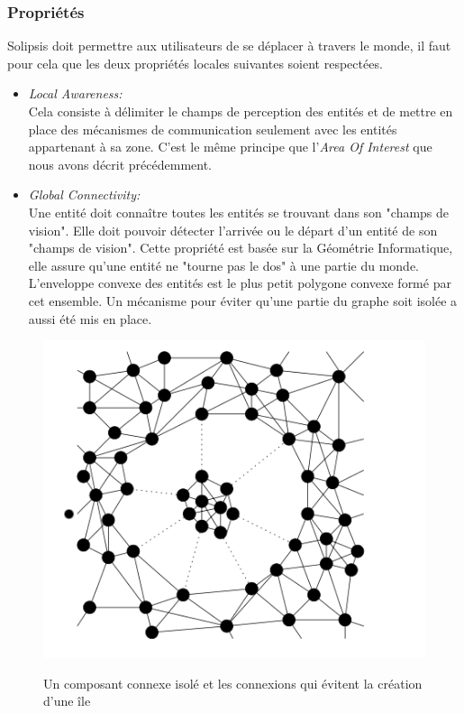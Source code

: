 		\subsubsection{Propriétés}
	Solipsis doit permettre aux utilisateurs de se déplacer à travers le monde, il faut pour cela que les deux propriétés locales suivantes soient respectées.
	\begin{itemize}
	\renewcommand{\labelitemi}{$\bullet$}
		\item \textit{Local Awareness:}\\
		Cela consiste à délimiter le champs de perception des entités et de mettre en place des mécanismes de communication seulement avec les entités appartenant à sa zone. C'est le même principe que l'\textit{Area Of Interest} que nous avons décrit précédemment. 
		\item \textit{Global Connectivity:}\\
		Une entité doit connaître toutes les entités se trouvant dans son "champs de vision". Elle doit pouvoir détecter l'arrivée ou le départ d'un entité de son "champs de vision". Cette propriété est basée sur la Géométrie Informatique, elle assure qu'une entité ne "tourne pas le dos" à une partie du monde. L'enveloppe convexe des entités est le plus petit polygone convexe formé par cet ensemble. Un mécanisme pour éviter qu'une partie du graphe soit isolée a aussi été mis en place.\\
	\end{itemize}
        \vspace{1cm}
	\begin{figure}[!h]
	\centering
        \includegraphics[scale=0.8]{../Images/composant_isole1.png}\\
        \caption{Un composant connexe isolé et les connexions qui évitent la création d'une île}
        \label{Envelop_Convex}
        \end{figure}

